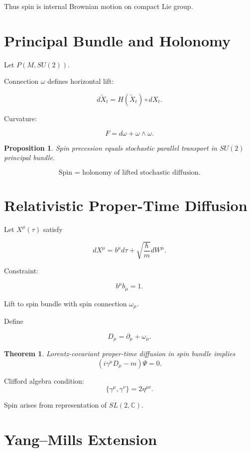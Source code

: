 \documentclass[11pt]{article}
\newtheorem{theorem}{Theorem}
\newtheorem{proposition}{Proposition}
\begin{document}
Thus spin is internal Brownian motion on compact Lie group.

\section{Principal Bundle and Holonomy}

Let $P(M,SU(2))$.

Connection $\omega$ defines horizontal lift:

\[
d\tilde{X}_t
=
H(\tilde{X}_t)\circ dX_t.
\]

Curvature:

\[
F=d\omega+\omega\wedge\omega.
\]

\begin{proposition}
Spin precession equals stochastic parallel transport
in $SU(2)$ principal bundle.
\end{proposition}

\[
\boxed{
\text{Spin = holonomy of lifted stochastic diffusion.}
}
\]

\section{Relativistic Proper-Time Diffusion}

Let $X^\mu(\tau)$ satisfy

\[
dX^\mu = b^\mu d\tau
+ \sqrt{\frac{\hbar}{m}}dW^\mu.
\]

Constraint:

\[
b^\mu b_\mu=1.
\]

Lift to spin bundle with spin connection $\omega_\mu$.

Define

\[
D_\mu = \partial_\mu + \omega_\mu.
\]

\begin{theorem}
Lorentz-covariant proper-time diffusion
in spin bundle implies
\[
(i\gamma^\mu D_\mu - m)\Psi=0.
\]
\end{theorem}

Clifford algebra condition:
\[
\{\gamma^\mu,\gamma^\nu\}=2\eta^{\mu\nu}.
\]

Spin arises from representation of $SL(2,\mathbb{C})$.

\section{Yang–Mills Extension}
\end{document}
